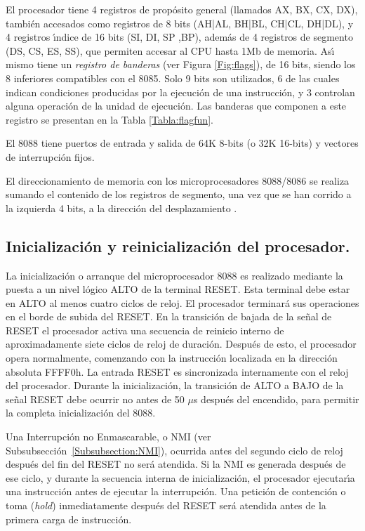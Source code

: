 El procesador tiene 4 registros de prop\'osito general (llamados AX, BX, CX, DX), tambi\'en %
accesados como registros de 8 bits (AH|AL, BH|BL, CH|CL, DH|DL), y 4 registros \'{\i}ndice de %
16 bits (SI, DI, SP ,BP), adem\'as de 4 registros de segmento (DS, CS, ES, SS), que permiten %
accesar al CPU hasta 1Mb de memoria. As\'{\i} mismo tiene un {\em registro de banderas\/} %
(ver Figura \ref{Fig:flags}), de 16 bits, siendo los 8 inferiores compatibles con el 8085. Solo %
9 bits son utilizados, 6 de las cuales indican condiciones producidas por la ejecuci\'on de una %
instrucci\'on, y 3 controlan alguna operaci\'on de la unidad de ejecuci\'on. Las banderas que %
componen a este registro se presentan en la Tabla \ref{Tabla:flagfun}.

El 8088 tiene puertos de entrada y salida de 64K 8-bits (o 32K 16-bits) y vectores de %
interrupci\'on fijos.

El direccionamiento de memoria con los microprocesadores 8088/8086 se realiza sumando el %
contenido de los registros de segmento, una vez que se han corrido a la izquierda 4 bits, a la %
direcci\'on del desplazamiento \cite{Micro:Hist}.


\subsection{Inicializaci\'on y reinicializaci\'on del procesador.}
\label{Subsection:inicreset}

La inicializaci\'on o arranque del microprocesador 8088 es realizado mediante la puesta a un %
nivel l\'ogico ALTO de la terminal RESET. Esta terminal debe estar en ALTO al menos cuatro %
ciclos de reloj. El procesador terminar\'a sus operaciones en el borde de subida del RESET. En %
la transici\'on de bajada de la se\~nal de RESET el procesador activa una secuencia de reinicio %
interno de aproximadamente siete ciclos de reloj de duraci\'on. Despu\'es de esto, el %
procesador opera normalmente, comenzando con la instrucci\'on localizada en la direcci\'on %
absoluta FFFF0h. La entrada RESET es sincronizada internamente con el reloj del procesador. %
Durante la inicializaci\'on, la transici\'on de ALTO a BAJO de la se\~nal RESET debe ocurrir no %
antes de 50 $\mu$s despu\'es del encendido, para permitir la completa inicializaci\'on del %
8088.

Una Interrupci\'on no Enmascarable, o NMI (ver Subsubsecci\'on~\ref{Subsubsection:NMI}), %
ocurrida antes del segundo ciclo de reloj despu\'es del fin del RESET no ser\'a atendida. Si la %
NMI es ge\-ne\-ra\-da despu\'es de ese ciclo, y durante la secuencia interna de %
inicializaci\'on, el procesador ejecutar\'{\i}a una instrucci\'on antes de ejecutar la %
interrupci\'on. Una petici\'on de contenci\'on o toma ({\it hold\/}) inmediatamente despu\'es %
del RESET ser\'a atendida antes de la primera carga de instrucci\'on.

